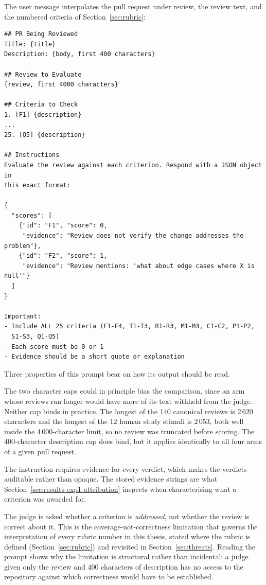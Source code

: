 The user message interpolates the pull request under review, the review text, and
the numbered criteria of Section~\ref{sec:rubric}:

{\footnotesize
\begin{verbatim}
## PR Being Reviewed
Title: {title}
Description: {body, first 400 characters}

## Review to Evaluate
{review, first 4000 characters}

## Criteria to Check
1. [F1] {description}
...
25. [Q5] {description}

## Instructions
Evaluate the review against each criterion. Respond with a JSON object in
this exact format:

{
  "scores": [
    {"id": "F1", "score": 0,
     "evidence": "Review does not verify the change addresses the problem"},
    {"id": "F2", "score": 1,
     "evidence": "Review mentions: 'what about edge cases where X is null'"}
  ]
}

Important:
- Include ALL 25 criteria (F1-F4, T1-T3, R1-R3, M1-M3, C1-C2, P1-P2,
  S1-S3, Q1-Q5)
- Each score must be 0 or 1
- Evidence should be a short quote or explanation
\end{verbatim}
}

Three properties of this prompt bear on how its output should be read.

The two character caps could in principle bias the comparison, since an arm whose
reviews ran longer would have more of its text withheld from the judge. Neither
cap binds in practice. The longest of the 140 canonical reviews is 2\,620
characters and the longest of the 12 human study stimuli is 2\,053, both well
inside the 4\,000-character limit, so no review was truncated before scoring. The
400-character description cap does bind, but it applies identically to all four
arms of a given pull request.

The instruction requires evidence for every verdict, which makes the verdicts
auditable rather than opaque. The stored evidence strings are what
Section~\ref{sec:results-exp1-attribution} inspects when characterising what a
criterion was awarded for.

The judge is asked whether a criterion is \emph{addressed}, not whether the
review is correct about it. This is the coverage-not-correctness limitation that
governs the interpretation of every rubric number in this thesis, stated where
the rubric is defined (Section~\ref{sec:rubric}) and revisited in
Section~\ref{sec:threats}. Reading the prompt shows why the limitation is
structural rather than incidental: a judge given only the review and 400
characters of description has no access to the repository against which
correctness would have to be established.
